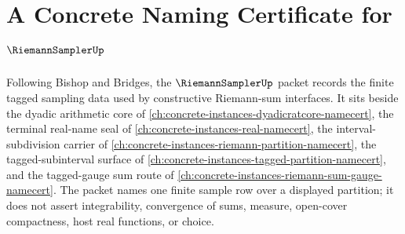 \chapter{A Concrete Naming Certificate for $\RiemannSamplerUp$}
\label{ch:concrete-instances-riemann-sampler-namecert}

Following Bishop and Bridges, the $\RiemannSamplerUp$ packet records the finite tagged sampling data used by constructive Riemann-sum interfaces. It sits beside the dyadic arithmetic core of \autoref{ch:concrete-instances-dyadicratcore-namecert}, the terminal real-name seal of \autoref{ch:concrete-instances-real-namecert}, the interval-subdivision carrier of \autoref{ch:concrete-instances-riemann-partition-namecert}, the tagged-subinterval surface of \autoref{ch:concrete-instances-tagged-partition-namecert}, and the tagged-gauge sum route of \autoref{ch:concrete-instances-riemann-sum-gauge-namecert}. The packet names one finite sample row over a displayed partition; it does not assert integrability, convergence of sums, measure, open-cover compactness, host real functions, or choice.

